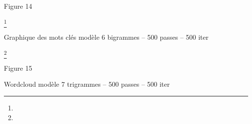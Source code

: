 \documentclass[letterpaper,portrait,12pt]{article}
\begin{document}
Figure 14





\footnote{} 


Graphique des mots cl\'{e}s mod\`{e}le 6 bigrammes -- 500 passes -- 500 iter
































	





























\footnote{} 


Figure 15





Wordcloud mod\`{e}le 7 trigrammes -- 500 passes -- 500 iter
\end{document}
